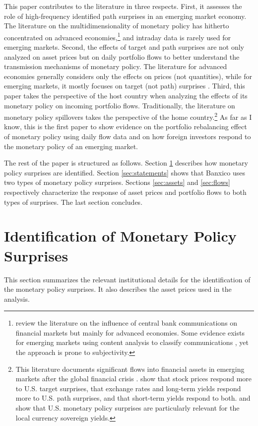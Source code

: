 \documentclass[a4paper, 12pt]{article}
\begin{document}
This paper contributes to the literature in three respects. 
First, it assesses the role of high-frequency identified path surprises in an emerging market economy. 
The literature on the multidimensionality of monetary policy has hitherto concentrated on advanced economies,\footnote{ \textcite{Blinderetal:2008} review the literature on the influence of central bank communications on financial markets but mainly for advanced economies. Some evidence exists for emerging markets using content analysis to classify communications \parencite{SuAhmadWood:2019}, yet the approach is prone to subjectivity.} and intraday data is rarely used for emerging markets. 
Second, the effects of target and path surprises are not only analyzed on asset prices but on daily portfolio flows to better understand the transmission mechanisms of monetary policy. The literature for advanced economies generally considers only the effects on prices (not quantities), while for emerging markets, it mostly focuses on target (not path) surprises \parencite{Kohlscheen:2014,Solis:FX}. 
Third, this paper takes the perspective of the host country when analyzing the effects of its monetary policy on incoming portfolio flows. Traditionally, the literature on monetary policy spillovers takes the perspective of the home country.\footnote{This literature documents significant flows into financial assets in emerging markets after the global financial crisis \parencite{FratzscherLoDucaStraub:2018}. \textcite{HausmanWongswan:2011} show that stock prices respond more to U.S. target surprises, that exchange rates and long-term yields respond more to U.S. path surprises, and that short-term yields respond to both. \textcite{BowmanLondonoSapriza:2015} and \textcite{Fischer:2020} show that U.S. monetary policy surprises are particularly relevant for the local currency sovereign yields.} 
As far as I know, this is the first paper to show evidence on the portfolio rebalancing effect of monetary policy using daily flow data and on how foreign investors respond to the monetary policy of an emerging market.

The rest of the paper is structured as follows. 
Section \ref{sec:mpsidentification} describes how monetary policy surprises are identified. 
Section \ref{sec:statements} shows that Banxico uses two types of monetary policy surprises. Sections \ref{sec:assets} and \ref{sec:flows} respectively characterize the response of asset prices and portfolio flows to both types of surprises. The last section concludes.


\section{Identification of Monetary Policy Surprises} \label{sec:mpsidentification}
This section summarizes the relevant institutional details for the identification of the monetary policy surprises. It also describes the asset prices used in the analysis. 
\end{document}
